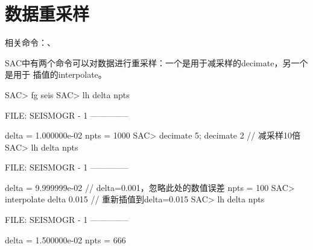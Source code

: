 \section{数据重采样}
相关命令：、

SAC中有两个命令可以对数据进行重采样：一个是用于减采样的decimate，另一个是用于
插值的interpolate。

\begin{SACCode}
SAC> fg seis
SAC> lh delta npts
  
  FILE: SEISMOGR - 1
 --------------

     delta = 1.000000e-02
      npts = 1000
SAC> decimate 5; decimate 2     // 减采样10倍
SAC> lh delta npts
  
  FILE: SEISMOGR - 1
 --------------

     delta = 9.999999e-02       // delta=0.001，忽略此处的数值误差
      npts = 100
SAC> interpolate delta 0.015    // 重新插值到delta=0.015
SAC> lh delta npts
  
  FILE: SEISMOGR - 1
 --------------

     delta = 1.500000e-02
      npts = 666
\end{SACCode}
